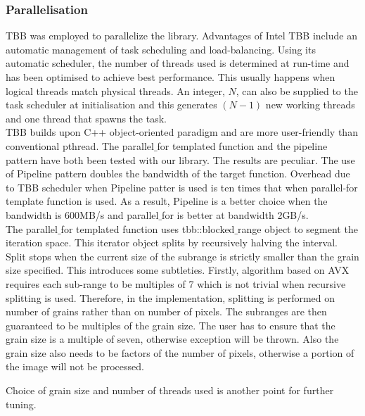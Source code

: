 \documentclass[journal]{IEEEtran}
\begin{document}
\subsubsection{Parallelisation}
TBB was employed to parallelize the library. Advantages of Intel TBB include an automatic management of task scheduling and load-balancing. Using its automatic scheduler, the number of threads used is determined at run-time and has been optimised to achieve best performance. This usually happens when logical threads match physical threads. An integer, $N$, can also be supplied to the task scheduler at initialisation and this generates $(N-1)$ new working threads and one thread that spawns the task. \\

TBB builds upon C++ object-oriented paradigm and are more user-friendly than conventional pthread. The parallel$\_$for templated function and the pipeline pattern have both been tested with our library. The results are peculiar. The use of Pipeline pattern doubles the bandwidth of the target function. Overhead due to TBB scheduler when Pipeline patter is used is ten times that when parallel-for template function is used. As a result, Pipeline is a better choice when the bandwidth is \texttildelow 600MB/s and parallel$\_$for is better at bandwidth \texttildelow 2GB/s. \\

The parallel$\_$for templated function uses tbb::blocked$\_$range object to segment the iteration space. This iterator object splits by recursively halving the interval. Split stops when the current size of the subrange is strictly smaller than the grain size specified. This introduces some subtleties. Firstly, algorithm based on AVX requires each sub-range to be multiples of 7 which is not trivial when recursive splitting is used. Therefore, in the implementation, splitting is performed on number of grains rather than on number of pixels. The subranges are then guaranteed to be multiples of the grain size. The user has to ensure that the grain size is a multiple of seven, otherwise exception will be thrown. Also the grain size also needs to be factors of the number of pixels, otherwise a portion of the image will not be processed.

Choice of grain size and number of threads used is another point for further tuning.
\end{document}
